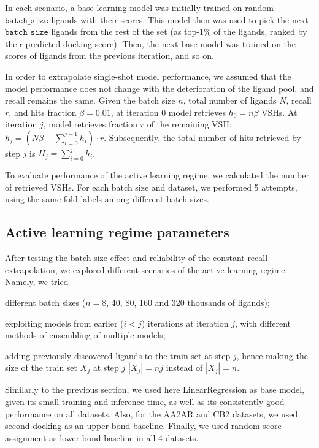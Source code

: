 In each scenario, a base learning model was initially trained on random $\texttt{batch\_size}$ ligands with their scores. This model then was used to pick the next $\texttt{batch\_size}$ ligands from the rest of the set (as top-1\% of the ligands, ranked by their predicted docking score). Then, the next base model was trained on the scores of ligands from the previous iteration, and so on.

In order to extrapolate single-shot model performance, we assumed that the model performance does not change with the deterioration of the ligand pool, and recall remains the same. Given the batch size $n$, total number of ligands $N$, recall $r$, and hits fraction $\beta=0.01$, at iteration 0 model retrieves $h_0 = n\beta$ VSHs. At iteration $j$, model retrieves fraction $r$ of the remaining VSH: $h_j = ( N\beta - \sum_{i=0}^{j-1}h_i ) \cdot r$. Subsequently, the total number of hits retrieved by step $j$ is $H_j = \sum_{i=0}^{j} h_i$.

To evaluate performance of the active learning regime, we calculated the number of retrieved VSHs. For each batch size and dataset, we performed 5 attempts, using the same fold labels among different batch sizes.

\subsection{Active learning regime parameters}

After testing the batch size effect and reliability of the constant recall extrapolation, we explored different scenarios of the active learning regime. Namely, we tried
\begin{enumerate*}[label=(\roman*)]
    \item different batch sizes ($n=8$, 40, 80, 160 and 320 thousands of ligands);
    \item exploiting models from earlier ($i < j$) iterations at iteration $j$, with different methods of ensembling of multiple models;
    \item adding previously discovered ligands to the train set at step $j$, hence making the size of the train set $X_j$ at step $j$ $|X_j| = nj$ instead of $|X_j|=n$.
\end{enumerate*}

Similarly to the previous section, we used here LinearRegression as base model, given its small training and inference time, as well as its consistently good performance on all datasets. Also, for the AA2AR and CB2 datasets, we used second docking as an upper-bond baseline. Finally, we used random score assignment as lower-bond baseline in all 4 datasets. 

